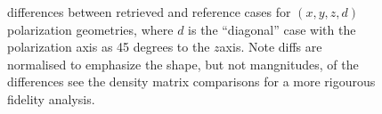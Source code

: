 \documentclass[letterpaper,table,10pt,english]{jupyterBook}
\begin{document}
\begin{figure}[htbp]
\centering
\capstart

\noindent{}
\caption{{\hyperref[\detokenize{backmatter/glossary:term-MF}]{}} differences between retrieved and reference cases for \((x,y,z,d)\) polarization geometries, where \(d\) is the “diagonal” case with the polarization axis as 45 degrees to the \(z\)\sphinxhyphen{}axis. Note diffs are normalised to emphasize the shape, but not mangnitudes, of the differences \sphinxhyphen{} see the density matrix comparisons for a more rigourous fidelity analysis.}\label{\detokenize{part2/case-study-OCS_290723:fig-ocs-diff}}\end{figure}
\end{document}

